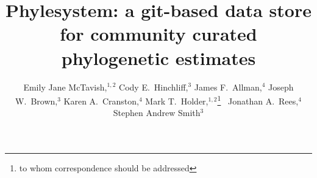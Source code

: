 \documentclass{bioinfo}
\begin{document}
\title[phylesystem git phylostore]{Phylesystem: a git-based data store for community curated phylogenetic estimates}

\author[McTavish\textit{et~al}]{
    Emily Jane McTavish,$^{1,2}$
    Cody E.~Hinchliff,${^3}$
    James F.~Allman,${^4}$
    Joseph W.~Brown,${^3}$
    Karen A.~Cranston,${^4}$
    Mark T.~Holder,$^{1,2}$\footnote{to whom correspondence should be addressed}~
    Jonathan A.~Rees,${^4}$
    Stephen Andrew Smith${^3}$
}
\address{$^{1}$Department of Ecology and Evolutionary Biology, University of Kansas, Lawrence KS, USA\\
$^{2}$Heidelberg Institute of Theoretical Studies, Heidelberg, Germany \\
$^{3}$Department of Ecology and Evolutionary Biology, University of Michigan, Ann Arbor, Michigan, USA\\
$^{4}$National Evolutionary Synthesis Center, Duke University, Durham, North Carolina, USA}


\maketitle
\end{document}
